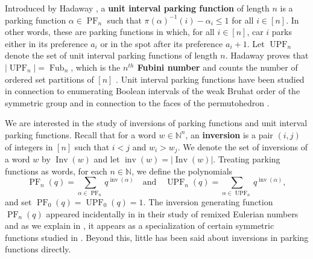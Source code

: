 \documentclass{amsart}
\newcommand{\seqnum}[1]{\href{http://oeis.org/#1}{\underline{#1}}}
\newcommand{\N}{\mathbb{N}}
\DeclareMathOperator{\inv}{inv}
\DeclareMathOperator{\Inv}{Inv}
\DeclareMathOperator{\PF}{PF}
\DeclareMathOperator{\UPF}{UPF} %
\DeclareMathOperator{\Fub}{Fub}
\newcommand{\defterm}{\textbf}
\theoremstyle{definition}
\begin{document}
Introduced by Hadaway \cite{bib:HadawayUndergradThesis},  a \defterm{unit interval parking function} of length $n$ is a parking function $\alpha\in \PF_n$ such that $\pi(\alpha)^{-1}(i)-\alpha_i\leq 1$ for all $i\in[n]$. 
In other words, these are parking functions in which, for all $i\in[n]$, car $i$ parks either in its preference $a_i$ or in the spot after its preference $a_i+1$.
Let $\UPF_n$ denote the set of unit interval parking functions of length $n$. 
Hadaway \cite{bib:HadawayUndergradThesis} proves that $|\UPF_n|=\Fub_n$, which is the \textbf{$n^{th}$ Fubini number} and counts the number of ordered set partitions of $[n]$  \cite[\seqnum{A000670}]{OEIS}. 
Unit interval parking functions have been studied in connection to enumerating Boolean intervals of the weak Bruhat order of the symmetric group and in connection to the faces of the permutohedron \cite{unit_perm,elder2024parking}.

We are interested in the study of inversions of parking functions and unit interval parking functions. 
Recall that for a word $w\in \N^n$, an \defterm{inversion} is a pair $(i,j)$ of integers in $[n]$ such that $i<j$ and $w_i>w_j$.
We denote the set of inversions of a word $w$ by $\Inv(w)$ and let $\inv(w)=|\Inv(w)|$. 
Treating parking functions as words, for each $n\in\N$, we define the polynomials
\[\PF_n(q)=\sum_{\alpha\in \PF_n}q^{\inv(\alpha)}\quad \mbox{and}\quad\UPF_n(q)=\sum_{\alpha\in \UPF_n}q^{\inv(\alpha)}, \]
and set $\PF_0(q)=\UPF_0(q)=1$. 
The inversion generating function $\PF_n(q)$ appeared incidentally in \cite[Section 8]{NadTew23} in their study of remixed Eulerian numbers and as we explain in , it appears as a specialization of certain symmetric functions studied in \cite{haiman_conjectures_1994}. Beyond this, little  has been said about inversions in parking functions directly. 
\end{document}
